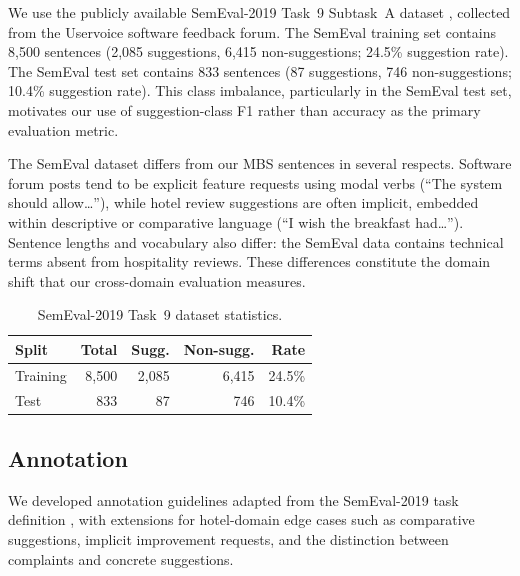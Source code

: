 We use the publicly available SemEval-2019 Task~9 Subtask~A dataset
\citep{negi2019semeval}, collected from the Uservoice software feedback forum.
The SemEval training set contains 8,500 sentences (2,085
suggestions, 6,415 non-suggestions; 24.5\% suggestion rate). The
SemEval test set contains 833 sentences (87 suggestions, 746
non-suggestions; 10.4\% suggestion rate). This class imbalance,
particularly in the SemEval test set, motivates our use of
suggestion-class
F1 rather than accuracy as the primary evaluation metric.

The SemEval dataset differs from our MBS sentences in several respects. Software
forum posts tend to be explicit feature requests using modal verbs (``The system
should allow\ldots''), while hotel review suggestions are often implicit,
embedded within descriptive or comparative language (``I wish the breakfast
had\ldots''). Sentence lengths and vocabulary also differ: the SemEval data
contains technical terms absent from hospitality reviews. These differences
constitute the domain shift that our cross-domain evaluation measures.

\begin{table}[t]
\centering\small
\caption{SemEval-2019 Task~9 dataset statistics.}
\label{tab:semeval-stats}
\begin{tabular}{lrrrr}
\toprule
\textbf{Split} & \textbf{Total} & \textbf{Sugg.} & \textbf{Non-sugg.} & \textbf{Rate} \\
\midrule
Training & 8,500 & 2,085 & 6,415 & 24.5\% \\
Test     &   833 &    87 &   746 & 10.4\% \\
\bottomrule
\end{tabular}
\end{table}

\subsection{Annotation}

We developed annotation guidelines adapted from the SemEval-2019
task definition \citep{negi2019semeval,negi2018open}, with
extensions for hotel-domain edge cases such as comparative
suggestions, implicit improvement requests, and the distinction
between complaints and concrete suggestions.

